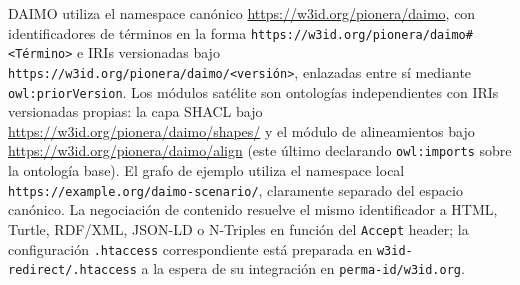 \documentclass[Afour,sagev,times]{sagej}
\newcommand{\code}[1]{\texttt{#1}}
\begin{document}
DAIMO utiliza el namespace canónico \url{https://w3id.org/pionera/daimo}, con identificadores de términos en la forma \code{https://w3id.org/pionera/daimo\#<Término>} e IRIs versionadas bajo \code{https://w3id.org/pionera/daimo/<versión>}, enlazadas entre sí mediante \code{owl:priorVersion}. Los módulos satélite son ontologías independientes con IRIs versionadas propias: la capa SHACL bajo \url{https://w3id.org/pionera/daimo/shapes/} y el módulo de alineamientos bajo \url{https://w3id.org/pionera/daimo/align} (este último declarando \code{owl:imports} sobre la ontología base). El grafo de ejemplo utiliza el namespace local \code{https://example.org/daimo-scenario/}, claramente separado del espacio canónico. La negociación de contenido resuelve el mismo identificador a HTML, Turtle, RDF/XML, JSON-LD o N-Triples en función del \code{Accept} header; la configuración \code{.htaccess} correspondiente está preparada en \code{w3id-redirect/.htaccess} a la espera de su integración en \code{perma-id/w3id.org}.
\end{document}
